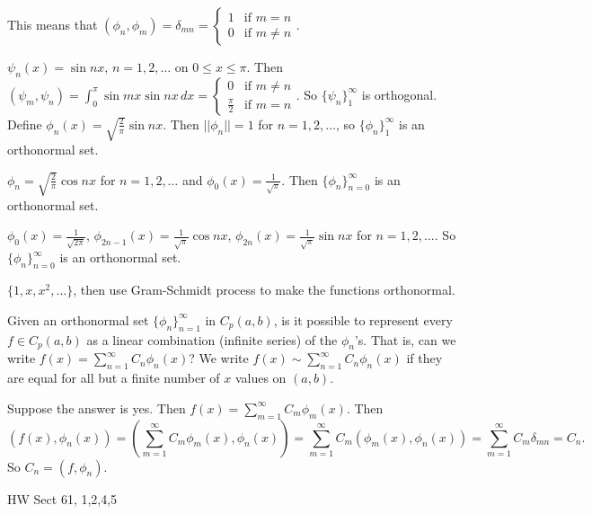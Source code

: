 \documentclass[]{article}
\begin{document}
This means that $(\phi_n,\phi_m) = \delta_{mn} = \begin{cases} 1 & \text{if }m=n \\ 0 & \text{if } m\neq n \end{cases}$.
\begin{example}
	$\psi_n(x) = \sin{nx}$, $n=1,2,\dots$ on $0\leq x \leq \pi$. Then $(\psi_m,\psi_n) = \int_0^\pi \sin{mx}\sin{nx} \, dx = \begin{cases} 0 & \text{if }m\neq n \\ \frac{\pi}{2} & \text{if }m=n \end{cases}$. So $\{\psi_n\}_1^\infty$ is orthogonal. Define $\phi_n(x) = \sqrt{\frac{2}{\pi}} \sin{nx}$. Then $||\phi_n|| = 1$ for $n=1,2,\dots$, so $\{\phi_n\}_1^\infty$ is an orthonormal set.
\end{example}
\begin{example}
	$\phi_n = \sqrt{\frac{2}{\pi}}\cos{nx}$ for $n=1,2,\dots$ and $\phi_0(x) = \frac{1}{\sqrt{\pi}}$. Then $\{\phi_n\}_{n=0}^\infty$ is an orthonormal set.
\end{example}
\begin{example}
	$\phi_0(x) = \frac{1}{\sqrt{2\pi}}$, $\phi_{2n-1}(x) = \frac{1}{\sqrt{\pi}} \cos{nx}$, $\phi_{2n}(x) = \frac{1}{\sqrt{\pi}} \sin{nx}$ for $n=1,2,\dots$. So $\{\phi_n\}_{n=0}^\infty$ is an orthonormal set.
\end{example}
\begin{example}
	$\{1,x,x^2,\dots\}$, then use Gram-Schmidt process to make the functions orthonormal.
\end{example}
\begin{question}
	Given an orthonormal set $\{\phi_n\}_{n=1}^\infty$ in $C_p(a,b)$, is it possible to represent every $f\in C_p(a,b)$ as a linear combination (infinite series) of the $\phi_n$'s. That is, can we write $f(x) = \sum_{n=1}^\infty C_n \phi_n(x)$? We write $f(x) \sim \sum_{n=1}^\infty C_n\phi_n(x)$ if they are equal for all but a finite number of $x$ values on $(a,b)$.
\end{question}
Suppose the answer is yes. Then $f(x) = \sum_{m=1}^\infty C_m \phi_m(x)$. Then $$(f(x),\phi_n(x)) = \left(\sum_{m=1}^\infty C_m \phi_m(x), \phi_n(x) \right) = \sum_{m=1}^\infty C_m (\phi_m(x),\phi_n(x)) = \sum_{m=1}^\infty C_m \delta_{mn} = C_n.$$ So $C_n = (f,\phi_n)$.

HW Sect 61, 1,2,4,5
\end{document}
